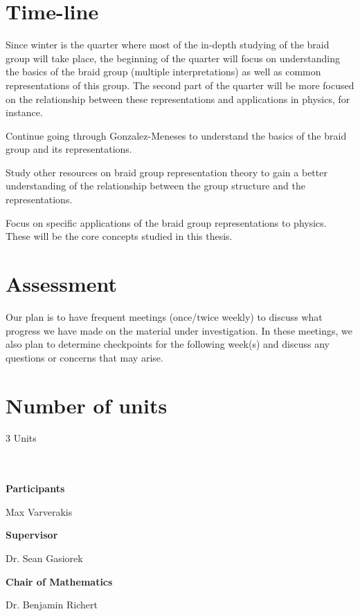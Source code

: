 \documentclass[oneside]{memoir}
\begin{document}
\section{Time-line}

Since winter is the quarter where most of the in-depth studying of the braid group will take place, the beginning of the quarter will focus on understanding the basics of the braid group (multiple interpretations) as well as common representations of this group. The second part of the quarter will be more focused on the relationship between these representations and applications in physics, for instance.
\begin{description}[topsep=0pt,itemsep=0ex]
    \item[\parbox{5em}{Weeks 1-3}] Continue going through Gonzalez-Meneses to understand the basics of the braid group and its representations.
    \item[\parbox{5em}{Week 4-6}] Study other resources on braid group representation theory to gain a better understanding of the relationship between the group structure and the representations.
    \item[\parbox{5em}{Weeks 7-10}] Focus on specific applications of the braid group representations to physics. These will be the core concepts studied in this thesis.
\end{description}




\section{Assessment}

Our plan is to have frequent meetings (once/twice weekly) to discuss what progress we have made on the material under investigation.  In these meetings, we also plan to determine checkpoints for the following week(s) and discuss any questions or concerns that may arise.

\section{Number of units}

3 Units

\vspace{1in}
\dotfill\\\\
\textbf{Participants}

\parbox{11em}{Max Varverakis} %

\textbf{Supervisor}

\parbox{11em}{Dr. Sean Gasiorek} %

\textbf{Chair of Mathematics}

\parbox{11em}{Dr. Benjamin Richert} %
\end{document}
